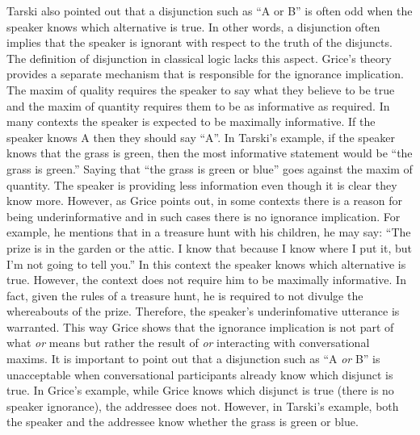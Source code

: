 \documentclass[oneside]{report}
\theoremstyle{definition}
\theoremstyle{definition}
\theoremstyle{definition}
\theoremstyle{remark}
\begin{document}
Tarski also pointed out that a disjunction such as ``A or B'' is often
odd when the speaker knows which alternative is true. In other words, a
disjunction often implies that the speaker is ignorant with respect to
the truth of the disjuncts. The definition of disjunction in classical
logic lacks this aspect. Grice's theory provides a separate mechanism
that is responsible for the ignorance implication. The maxim of quality
requires the speaker to say what they believe to be true and the maxim
of quantity requires them to be as informative as required. In many
contexts the speaker is expected to be maximally informative. If the
speaker knows A then they should say ``A''. In Tarski's example, if the
speaker knows that the grass is green, then the most informative
statement would be ``the grass is green.'' Saying that ``the grass is
green or blue'' goes against the maxim of quantity. The speaker is
providing less information even though it is clear they know more.
However, as Grice points out, in some contexts there is a reason for
being underinformative and in such cases there is no ignorance
implication. For example, he mentions that in a treasure hunt with his
children, he may say: ``The prize is in the garden or the attic. I know
that because I know where I put it, but I'm not going to tell you.'' In
this context the speaker knows which alternative is true. However, the
context does not require him to be maximally informative. In fact, given
the rules of a treasure hunt, he is required to not divulge the
whereabouts of the prize. Therefore, the speaker's underinfomative
utterance is warranted. This way Grice shows that the ignorance
implication is not part of what \emph{or} means but rather the result of
\emph{or} interacting with conversational maxims. It is important to
point out that a disjunction such as ``A \emph{or} B'' is unacceptable
when conversational participants already know which disjunct is true. In
Grice's example, while Grice knows which disjunct is true (there is no
speaker ignorance), the addressee does not. However, in Tarski's
example, both the speaker and the addressee know whether the grass is
green or blue.
\end{document}
